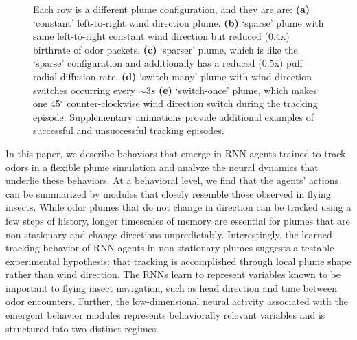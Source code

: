 \documentclass[5p,twocolumn,authoryear]{elsarticle}
\begin{document}
\begin{figure}[h!]
\begin{center}
{Each row is a different plume configuration, and they are are:
\textbf{(a)} `constant' left-to-right wind direction plume. 
\textbf{(b)} `sparse' plume with same left-to-right constant wind direction but reduced (0.4x) birthrate of odor packets.
\textbf{(c)} `sparser' plume, which is like the `sparse' configuration and additionally has a reduced (0.5x) puff radial diffusion-rate.
\textbf{(d)} `switch-many' plume with wind direction switches occurring every $\sim 3s$ 
\textbf{(e)} `switch-once' plume, which makes one 45$^{\circ}$ counter-clockwise wind direction switch during the tracking episode.
Supplementary animations provide additional examples of successful and unsuccessful tracking episodes.
}
\label{fig_behavior_qual}
\end{center}
\end{figure}


In this paper, we describe behaviors that emerge in RNN agents trained to track odors in a flexible plume simulation and analyze the neural dynamics that underlie these behaviors.
At a behavioral level, we find that the agents' actions can be summarized by  modules that closely resemble those observed in flying insects. 
While odor plumes that do not change in direction can be tracked using a few steps of history, longer timescales of memory are essential for plumes that are non-stationary and change directions unpredictably.
Interestingly, the learned tracking behavior of RNN agents in non-stationary plumes suggests a testable experimental hypothesis:  that tracking is accomplished through local plume shape rather than wind direction.
The RNNs learn to represent variables known to be important to flying insect navigation, such as head direction and time between odor encounters.
Further, the low-dimensional neural activity associated with the emergent behavior modules represents behaviorally relevant variables and is structured into two distinct regimes.
\end{document}
